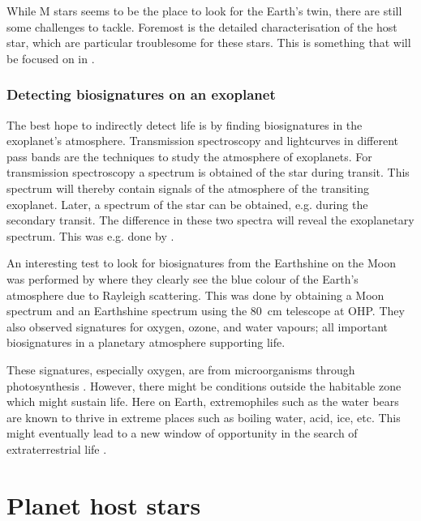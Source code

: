 While M stars seems to be the place to look for the Earth's twin, there are still some challenges to
tackle. Foremost is the detailed characterisation of the host star, which are particular troublesome
for these stars. This is something that will be focused on in .

\subsubsection{Detecting biosignatures on an exoplanet}

The best hope to indirectly detect life is by finding biosignatures \citep[see
e.g.]{Snellen2013,Kasting2002} in the exoplanet's atmosphere. Transmission spectroscopy and
lightcurves in different pass bands are the techniques to study the atmosphere of exoplanets. For
transmission spectroscopy a spectrum is obtained of the star during transit. This spectrum will
thereby contain signals of the atmosphere of the transiting exoplanet. Later, a spectrum of the star
can be obtained, e.g. during the secondary transit. The difference in these two spectra will reveal
the exoplanetary spectrum. This was e.g. done by \citet{Charbonneau2002}.

An interesting test to look for biosignatures from the Earthshine on the Moon was performed by
\citet{Arnold2002} where they clearly see the blue colour of the Earth's atmosphere due to Rayleigh
scattering. This was done by obtaining a Moon spectrum and an Earthshine spectrum using the
\SI{80}{cm} telescope at OHP. They also observed signatures for oxygen, ozone, and water vapours;
all important biosignatures in a planetary atmosphere supporting life.

These signatures, especially oxygen, are from microorganisms through photosynthesis
\citep[see e.g.][]{Kasting2002}. However, there might be conditions outside the habitable zone which
might sustain life. Here on Earth, extremophiles such as the water bears are known to thrive in
extreme places such as boiling water, acid, ice, etc. This might eventually lead to a new window of
opportunity in the search of extraterrestrial life \citep{Cavicchioli2002}.



\section{Planet host stars}
\label{sec:planet_host_stars}


